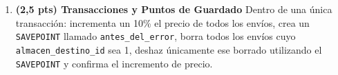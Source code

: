\documentclass[a4paper,11pt]{article}
\begin{document}
\begin{Form}
\begin{enumerate}[leftmargin=*, label=\textbf{Pregunta \arabic*:}]
    \item \textbf{(2,5 pts) Transacciones y Puntos de Guardado}
    Dentro de una única transacción: incrementa un 10\% el precio de todos los envíos, crea un \texttt{SAVEPOINT} llamado \texttt{antes\_del\_error}, borra todos los envíos cuyo \texttt{almacen\_destino\_id} sea 1, deshaz únicamente ese borrado utilizando el \texttt{SAVEPOINT} y confirma el incremento de precio.

\end{enumerate}

\end{Form}
\end{document}
